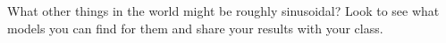{What other things in the world might be roughly sinusoidal?  Look to see what models you can find for them and share your results with your class.} 
{}